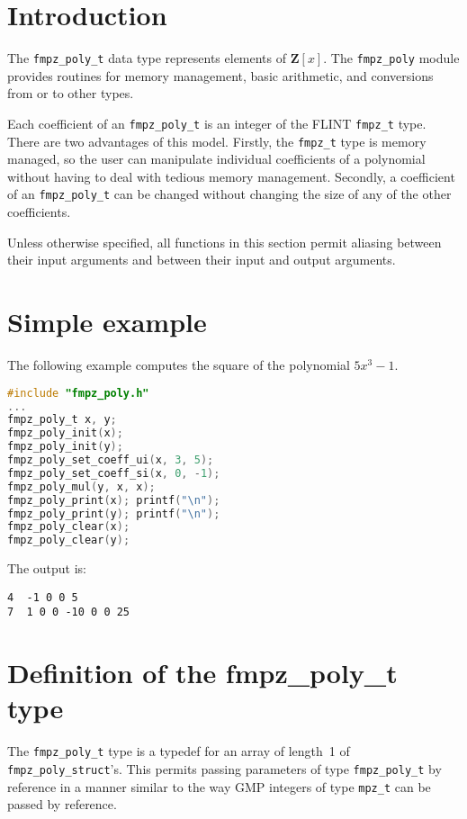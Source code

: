 \documentclass[a4paper,10pt]{book}
\newcommand{\Z}{\mathbf{Z}}%
\newcommand{\code}{\lstinline}
\begin{document}
\section{Introduction}

The \code{fmpz_poly_t} data type represents elements of $\Z[x]$. The 
\code{fmpz_poly} module provides routines for memory management, basic 
arithmetic, and conversions from or to other types.

Each coefficient of an \code{fmpz_poly_t} is an integer of the FLINT 
\code{fmpz_t} type.  There are two advantages of this model.  Firstly, 
the \code{fmpz_t} type is memory managed, so the user can manipulate 
individual coefficients of a polynomial without having to deal with 
tedious memory management.  Secondly, a coefficient of an 
\code{fmpz_poly_t} can be changed without changing the size of any 
of the other coefficients.

Unless otherwise specified, all functions in this section permit aliasing 
between their input arguments and between their input and output arguments.

\section{Simple example}

The following example computes the square of the polynomial $5x^3 - 1$.
\begin{lstlisting}[language=c]
#include "fmpz_poly.h"
...
fmpz_poly_t x, y;
fmpz_poly_init(x);
fmpz_poly_init(y);
fmpz_poly_set_coeff_ui(x, 3, 5);
fmpz_poly_set_coeff_si(x, 0, -1);
fmpz_poly_mul(y, x, x);
fmpz_poly_print(x); printf("\n");
fmpz_poly_print(y); printf("\n");
fmpz_poly_clear(x);
fmpz_poly_clear(y);
\end{lstlisting}

The output is:
\begin{lstlisting}
4  -1 0 0 5
7  1 0 0 -10 0 0 25
\end{lstlisting}

\section{Definition of the fmpz\_poly\_t type}

The \code{fmpz_poly_t} type is a typedef for an array of length~1 of 
\code{fmpz_poly_struct}'s.  This permits passing parameters of type 
\code{fmpz_poly_t} by reference in a manner similar to the way GMP integers 
of type \code{mpz_t} can be passed by reference. 
\end{document}
